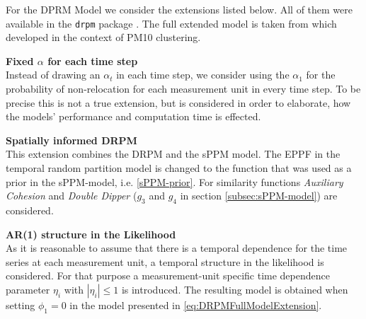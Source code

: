 \documentclass[12pt,a4paper]{article}
\newcommand*{\drpm}{\texttt{drpm}}
\begin{document}
For the DPRM Model we consider the extensions listed below. All 
of them were available in the \drpm{} package \cite{drpm}. The full 
extended model is taken from \cite[Section 4]{Page2021-Temporal}
which developed in the context of PM10 clustering.

\textbf{Fixed $\alpha$ for each time step}\\
Instead of drawing an $\alpha_t$ in each time step, we consider using the 
$\alpha_1$ for the probability of non-relocation for each measurement unit in 
every time step. To be precise this is not a true extension,
but is considered in order to elaborate, how the models' performance and
computation time is effected.

\textbf{Spatially informed DRPM}\\
This extension combines the DRPM and the sPPM model. The EPPF in the temporal random partition model is changed to the function that was used as a prior in the sPPM-model, i.e. \cref{sPPM-prior}. For similarity functions \textit{Auxiliary Cohesion} and \textit{Double Dipper} ($g_3$ and $g_4$ in section \ref{subsec:sPPM-model}) are considered.

\medskip

\textbf{AR(1) structure in the Likelihood}\\
As it is reasonable to assume that there is a temporal dependence for the time series at each measurement unit, a temporal structure in the likelihood is considered. For that purpose a measurement-unit specific time dependence parameter $\eta_i$ with $|\eta_i| \leq 1$ is introduced. The resulting model is obtained when setting $\phi_1 = 0$ in the model presented in \cref{eq:DRPMFullModelExtension}.
\end{document}
